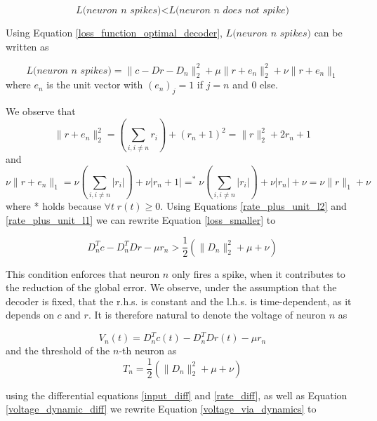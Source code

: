 \documentclass[twoside,11pt]{article}
\begin{document}
\begin{equation} \label{loss_smaller}
  \textit{L(neuron n spikes)} < \textit{L(neuron n does not spike)}
\end{equation}

Using Equation \ref{loss_function_optimal_decoder}, $\textit{L(neuron n spikes)}$ can be
written as

\begin{equation*}
  \textit{L(neuron n spikes)}=\|c-Dr-D_n \|_2^2+\mu\|r+e_n\|^2_2+\nu\|r+e_n\|_1
\end{equation*}
where $e_n$ is the unit vector with $(e_n)_j = 1$ if $j=n$ and 0 else.

We observe that
\begin{equation} \label{rate_plus_unit_l2}
  \|r+e_n\|^2_2 = (\sum_{i,i \neq n}r_i) + (r_n+1)^2 = \|r\|^2_2 + 2r_n + 1
\end{equation}
and
\begin{equation} \label{rate_plus_unit_l1}
  \nu \|r + e_n\|_1 = \nu (\sum_{i,i\neq n}|r_i|) + \nu |r_n+1| =^* \nu (\sum_{i,i\neq n}|r_i|) + \nu |r_n| +\nu = \nu \|r\|_1 + \nu  
\end{equation}
where * holds because $\forall t \; r(t) \geq 0$.
Using Equations \ref{rate_plus_unit_l2} and \ref{rate_plus_unit_l1} we can rewrite Equation
\ref{loss_smaller} to

\begin{equation} \label{network_dynamics}
  D_n^Tc - D_n^TDr - \mu r_n > \frac{1}{2} (\| D_n\|^2_2 + \mu + \nu) 
\end{equation}

This condition enforces that neuron $n$ only fires a spike, when it contributes
to the reduction of the global error. We observe,
under the assumption that the decoder is fixed, that the r.h.s. is constant and the l.h.s. is 
time-dependent, as it depends on $c$ and $r$.
It is therefore natural to denote the voltage of neuron $n$ as

\begin{equation} \label{voltage_via_dynamics}
  V_n(t) = D_n^Tc(t) - D_n^TDr(t) - \mu r_n 
\end{equation}
and the threshold of the $n$-th neuron as
\begin{equation} \label{threshold_via_dynamics}
  T_n = \frac{1}{2} (\| D_n\|^2_2 + \mu + \nu)
\end{equation}

using the differential equations \ref{input_diff} and \ref{rate_diff}, as well as Equation \ref{voltage_dynamic_diff}
we rewrite Equation \ref{voltage_via_dynamics} to
\end{document}
